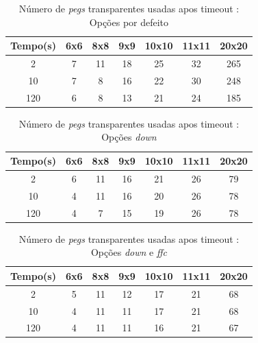 \documentclass{llncs}
\begin{document}
\setlength{\tabcolsep}{12pt}
\begin{table}[ht] 
\caption{N\'{u}mero de \emph{pegs} transparentes usadas apos timeout : Op\c{c}\~{o}es por defeito} %
\centering %
\begin{tabular}{c c c c c c c} %
\hline\hline %

Tempo(s) & 6x6 & 8x8 & 9x9 & 10x10 & 11x11 & 20x20\\ [0.5ex] %
\hline %
2 & 7 & 11 & 18 & 25 & 32 & 265 \\
10 & 7 & 8 & 16 & 22 & 30 & 248 \\
120 & 6 & 8 & 13 & 21 & 24 & 185 \\[1 ex]
\hline %
\end{tabular} 
\label{tabela:5} %
\end{table}


\setlength{\tabcolsep}{12pt}
\begin{table}[ht] 
\caption{N\'{u}mero de \emph{pegs} transparentes usadas apos timeout : Op\c{c}\~{o}es \emph{down}} %
\centering %
\begin{tabular}{c c c c c c c} %
\hline\hline %

Tempo(s) & 6x6 & 8x8 & 9x9 & 10x10 & 11x11 & 20x20\\ [0.5ex] %
\hline %
2 & 6 & 11 & 16 & 21 & 26 & 79 \\
10 & 4 & 11 & 16 & 20 & 26 & 78 \\
120 & 4 & 7 & 15 & 19 & 26 & 78 \\[1 ex]
\hline %
\end{tabular} 
\label{tabela:6} %
\end{table}


\setlength{\tabcolsep}{12pt}
\begin{table}[ht] 
\caption{N\'{u}mero de \emph{pegs} transparentes usadas apos timeout : Op\c{c}\~{o}es \emph{down} e \emph{ffc}} %
\centering %
\begin{tabular}{c c c c c c c} %
\hline\hline %

Tempo(s) & 6x6 & 8x8 & 9x9 & 10x10 & 11x11 & 20x20\\ [0.5ex] %
\hline %
2 & 5 & 11 & 12 & 17 & 21 & 68 \\
10 & 4 & 11 & 11 & 17 & 21 & 68 \\
120 & 4 & 11 & 11 & 16 & 21 & 67 \\[1 ex]
\hline %
\end{tabular} 
\label{tabela:7} %
\end{table}
\end{document}
